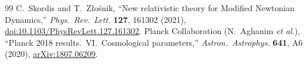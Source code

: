 \documentclass[11pt,letterpaper]{article}
\begin{document}
\begin{thebibliography}{99}
 C.~Skordis and T.~Z\l{}o\'snik, ``New relativistic theory for Modified Newtonian Dynamics,'' \emph{Phys.\ Rev.\ Lett.} \textbf{127}, 161302 (2021), \href{https://link.aps.org/doi/10.1103/PhysRevLett.127.161302}{doi:10.1103/PhysRevLett.127.161302}.
 Planck Collaboration (N.~Aghanim \emph{et al.}), ``Planck 2018 results.\ VI.\ Cosmological parameters,'' \emph{Astron.\ Astrophys.} \textbf{641}, A6 (2020), \href{https://arxiv.org/abs/1807.06209}{arXiv:1807.06209}.
\end{thebibliography}
\end{document}
